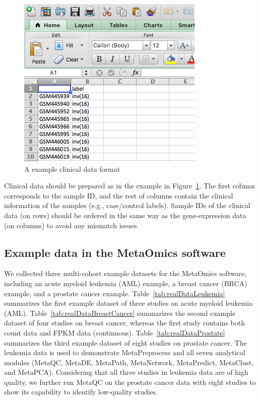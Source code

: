 \begin{figure}
\includegraphics[scale=0.5]{./figure/dataPreparation/clinicalData}
\caption{A example clinical data format}
\label{fig:clinical}
\end{figure}

Clinical data should be prepared as in the example in Figure~\ref{fig:clinical}.
The first column corresponds to the sample ID, and the rest of columns contain the clinical information of the samples (e.g., case/control labels). Sample IDs of the clinical data (on rows) should be ordered in the same way as the gene-expression data (on columns) to avoid any mismatch issues.  


\subsection{Example data in the MetaOmics software}


We collected three multi-cohort example datasets for the MetaOmics software, 
including an acute myeloid leukemia (AML) example,
a breast cancer (BRCA) example, 
and a prostate cancer example.
Table~\ref{tab:realDataLeukemia} summarizes the first example dataset of three studies on acute myeloid leukemia (AML).
Table~\ref{tab:realDataBreastCancer} summarizes the second example dataset of four studies on breast cancer, whereas the first study contains both count data and FPKM data (continuous).
Table~\ref{tab:realDataProstate} summarizes the third example dataset of eight studies on prostate cancer.
The leukemia data is used to demonstrate MetaPreprocess and all  seven analytical modules (MetaQC, MetaDE, MetaPath, MetaNetwork, MetaPredict, MetaClust, and MetaPCA). 
Considering that all three studies in leukemia data are of high quality, we further run MetaQC on the prostate cancer data with eight studies to show its capability to identify low-quality studies. 


